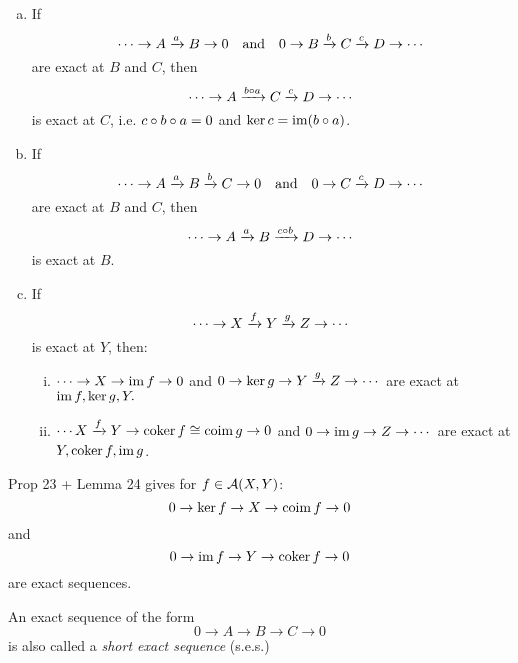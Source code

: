 \documentclass[a4paper]{report}
\begin{document}
\begin{lemm}\item
\begin{enumerate}[(a)]
        \item If
        \[
  \cdots \to A \xrightarrow a B \to 0 \quad \text{and} \quad
        0 \to B \xrightarrow b C \xrightarrow c D \to \cdots
        \]
        are exact at $B$ and $C$, then
        \[\cdots \to A \xrightarrow{b \circ a} C \xrightarrow c D \to \cdots\]
        is exact at $C$, i.e. $c \circ b \circ a = 0$ and $\ker c = \operatorname{im}(b \circ a)$.
  \item If
        \[
  \cdots \to A \xrightarrow a B \xrightarrow b C \to 0 \quad \text{and} \quad
        0 \to  C \xrightarrow c D \to \cdots
        \]
        are exact at $B$ and $C$, then
        \[\cdots \to A \xrightarrow a B \xrightarrow {c \circ b} D \to \cdots\]
        is exact at $B$.

  \item If
        \[\cdots \to X \xrightarrow f Y \xrightarrow g Z \to \cdots\]is exact at $Y$, then:
        \begin{enumerate}[(i)]
          \item $\cdots \to X \to \operatorname{im} f \to 0$ and $0 \to \ker g \to Y \xrightarrow g Z \to \cdots$ are exact at $\operatorname{im} f, \ker g, Y.$
                \item $\cdots X \xrightarrow f Y \to \operatorname{coker} f \cong \operatorname{coim} g \to 0$ and $0 \to \operatorname{im} g \to Z \to \cdots$ are exact at $Y, \operatorname{coker} f, \operatorname{im} g$.
        \end{enumerate}
\end{enumerate}
\end{lemm}

\begin{exmp*}
  Prop 23 + Lemma 24 gives for $f \in \mathcal{A}(X,Y)$:
  \[0 \to \ker f \to X \to \operatorname{coim} f \to 0\]
  and
  \[0 \to \operatorname{im} f \to Y \to \operatorname{coker} f \to 0\]
  are exact sequences.
\end{exmp*}
\begin{defi*}
  An exact sequence of the form \[0 \to A \to B \to C \to 0\]
  is also called a \emph{short exact sequence} (s.e.s.)
\end{defi*}
\end{document}
